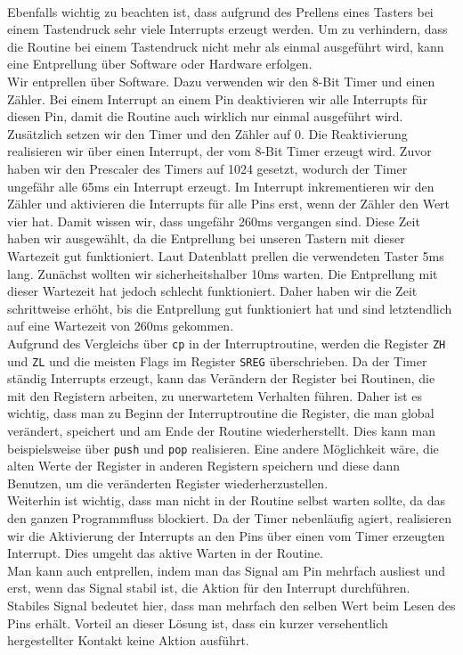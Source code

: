 \documentclass[]{article}
\begin{document}
\\Ebenfalls wichtig zu beachten ist, dass aufgrund des Prellens eines Tasters bei einem Tastendruck sehr viele Interrupts erzeugt werden. Um zu verhindern, dass die Routine bei einem Tastendruck nicht mehr als einmal ausgeführt wird, kann eine Entprellung über Software oder Hardware erfolgen. 
\\Wir entprellen über Software. Dazu verwenden wir den 8-Bit Timer und einen Zähler. Bei einem Interrupt an einem Pin deaktivieren wir alle Interrupts für diesen Pin, damit die Routine auch wirklich nur einmal ausgeführt wird. Zusätzlich setzen wir den Timer und den Zähler auf 0. Die Reaktivierung realisieren wir über einen Interrupt, der vom 8-Bit Timer erzeugt wird. Zuvor haben wir den Prescaler des Timers auf 1024 gesetzt, wodurch der Timer ungefähr alle 65ms ein Interrupt erzeugt. Im Interrupt inkrementieren wir den Zähler und aktivieren die Interrupts für alle Pins erst, wenn der Zähler den Wert vier hat. Damit wissen wir, dass ungefähr 260ms vergangen sind. Diese Zeit haben wir ausgewählt, da die Entprellung bei unseren Tastern mit dieser Wartezeit gut funktioniert. Laut Datenblatt prellen die verwendeten Taster 5ms lang. Zunächst wollten wir sicherheitshalber 10ms warten. Die Entprellung mit dieser Wartezeit hat jedoch schlecht funktioniert. Daher haben wir die Zeit schrittweise erhöht, bis die Entprellung gut funktioniert hat und sind letztendlich auf eine Wartezeit von 260ms gekommen. 
\\Aufgrund des Vergleichs über \texttt{cp} in der Interruptroutine, werden die Register \texttt{ZH} und \texttt{ZL} und die meisten Flags im Register \texttt{SREG} überschrieben. Da der Timer ständig Interrupts erzeugt, kann das Verändern der Register bei Routinen, die mit den Registern arbeiten, zu unerwartetem Verhalten führen. Daher ist es wichtig, dass man zu Beginn der Interruptroutine die Register, die man global verändert, speichert und am Ende der Routine wiederherstellt. Dies kann man beispielsweise über \texttt{push} und \texttt{pop} realisieren. Eine andere Möglichkeit wäre, die alten Werte der Register in anderen Registern speichern und diese dann Benutzen, um die veränderten Register wiederherzustellen. 
\\Weiterhin ist wichtig, dass man nicht in der Routine selbst warten sollte, da das den ganzen Programmfluss blockiert. Da der Timer nebenläufig agiert, realisieren wir die Aktivierung der Interrupts an den Pins über einen vom Timer erzeugten Interrupt. Dies umgeht das aktive Warten in der Routine.
\\Man kann auch entprellen, indem man das Signal am Pin mehrfach ausliest und erst, wenn das Signal stabil ist, die Aktion für den Interrupt durchführen. Stabiles Signal bedeutet hier, dass man mehrfach den selben Wert beim Lesen des Pins erhält. Vorteil an dieser Lösung ist, dass ein kurzer versehentlich hergestellter Kontakt keine Aktion ausführt.
\end{document}
